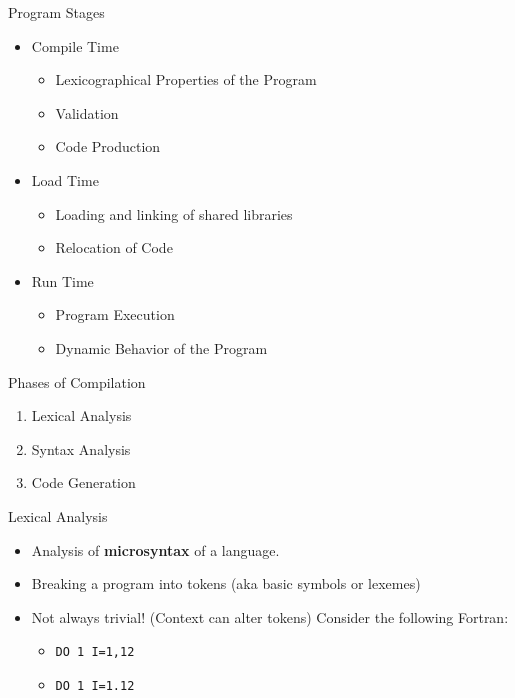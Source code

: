\documentclass{beamer}
\begin{document}
\begin{frame}{Program Stages}
    \begin{itemize}[<+(1)->]
        \item Compile Time
        \begin{itemize}
            \item Lexicographical Properties of the Program
            \item Validation
            \item Code Production
        \end{itemize}

        \item Load Time
        \begin{itemize}
            \item Loading and linking of shared libraries
            \item Relocation of Code
        \end{itemize}

        \item Run Time
        \begin{itemize}
            \item Program Execution
            \item Dynamic Behavior of the Program
        \end{itemize}
    \end{itemize}
\end{frame}


\begin{frame}{Phases of Compilation}
    \begin{enumerate}[<+->]
        \item Lexical Analysis
        \item Syntax Analysis
        \item Code Generation
    \end{enumerate}
\end{frame}


\begin{frame}{Lexical Analysis}
    \begin{itemize}[<+->]
        \item Analysis of {\bf microsyntax} of a language.
        \item Breaking a program into tokens (aka basic symbols or lexemes)
        \item Not always trivial! (Context can alter tokens)
        \newline Consider the following Fortran:
        \begin{itemize}
            \item {\tt DO 1 I=1,12}
            \item {\tt DO 1 I=1.12}
        \end{itemize}
    \end{itemize}
\end{frame}
\end{document}
